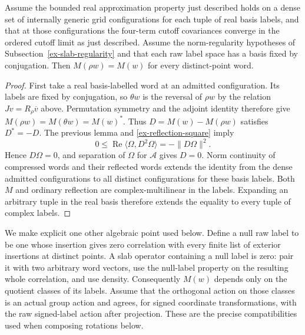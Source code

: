 \begin{proposition}
\label{ex-ordinary-reflection}
Assume the bounded real approximation property just described holds on
a dense set of internally generic grid configurations for each tuple of real
basis labels, and that at those configurations the four-term cutoff
covariances converge in the ordered cutoff limit as just described.
Assume the norm-regularity hypotheses of Subsection~\ref{ex-slab-regularity}
and that each raw label space has a basis fixed by conjugation.
Then \(M(\rho w)=M(w)\) for every distinct-point word.
\end{proposition}
\begin{proof}
First take a real basis-labelled word at an admitted configuration.
Its labels are fixed by conjugation, so \(\theta w\) is the reversal of
\(\rho w\) by the relation \(Jv=R_\rho\overline v\) above. Permutation
symmetry and the adjoint identity therefore give
\(M(\rho w)=M(\theta w)=M(w)^*\).
Thus \(D=M(w)-M(\rho w)\) satisfies \(D^*=-D\). The previous lemma
and \eqref{ex-reflection-square} imply
\[
 0\le\operatorname{Re}\langle\Omega,D^2\Omega\rangle
 =-\|D\Omega\|^2.
\]
Hence \(D\Omega=0\), and separation of \(\Omega\) for
\(\mathcal A\) gives \(D=0\). Norm continuity of compressed words
and their reflected words extends the identity from the dense admitted
configurations to all distinct configurations for these basis labels.
Both \(M\) and ordinary reflection are complex-multilinear in the
labels. Expanding an arbitrary tuple in the real basis therefore extends
the equality to every tuple of complex labels.
\end{proof}

We make explicit one other algebraic point used below. Define a null
raw label to be one whose insertion gives zero correlation with every
finite list of exterior insertions at distinct points. A slab operator
containing a null label is zero: pair it with two arbitrary word vectors,
use the null-label property on the resulting whole correlation, and use
density. Consequently \(M(w)\) depends only on the quotient classes of
its labels. Assume that the orthogonal action on those classes is an
actual group action and agrees, for signed coordinate transformations,
with the raw signed-label action after projection. These are the precise
compatibilities used when composing rotations below.


